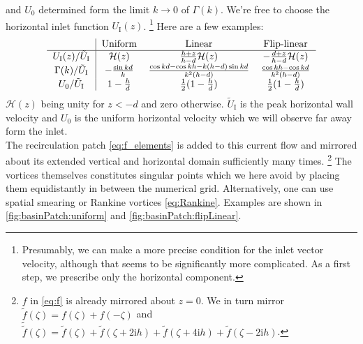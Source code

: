 \documentclass[a4paper,12pt]{article}
\newcommand{\mr}{\mathrm}
\newcommand{\mc}{\mathcal}
\newcommand{\ii}{\mr{i}}
\renewcommand{\_}[1]{_\mr{#1}}
\begin{document}
and $U_0$ determined form the limit $k\to0$ of $\Gamma(k)$.
We're free to choose the horizontal inlet function $U\_I(z)$.%
\footnote{Presumably, we can make a more precise condition for the inlet vector velocity, although that seems to be significantly more complicated. As a first step, we prescribe only the horizontal component.}
 Here are a few examples:
\begin{equation}
\begin{tabular}{c|ccc}
& Uniform & Linear & Flip-linear \\\hline
$U\_I(z)/\tilde U\_I$ & 
$\mc H(z) $&
$\frac{h+z}{h-d}\mc H(z)$&
$-\frac{d+z}{h-d}\mc H(z)$\\
$\Gamma(k)/\tilde U\_I$&
$-\frac{\sin kd}k$&
$\frac{\cos kd-\cos kh -k(h-d)\sin kd}{k^2(h-d)}$ &
$\frac{\cos kh-\cos kd }{k^2(h-d)}$\\
$U_0/\tilde U\_I$ &
$1-\frac hd$ &
$\frac12(1-\frac hd)$ &
$\frac12(1-\frac hd)$
\end{tabular}
\label{eq:Gammas}
\end{equation}
$\mc H(z)$ being unity for $z<-d$ and zero otherwise. $\tilde U\_I$ is the peak horizontal wall velocity and $U_0$ is the uniform horizontal velocity which we will observe far away form the inlet. 
\\

The recirculation patch \eqref{eq:f_elements} is added to this current flow and mirrored about its extended vertical and horizontal domain sufficiently many times.%
\footnote{$f$ in \eqref{eq:f} is already mirrored about $z=0$. We in turn mirror $\tilde f(\zeta)=f(\zeta)+f(-\zeta)$ and $\tilde{\tilde f}(\zeta)= \tilde f(\zeta) + \tilde f(\zeta+2\ii h)+ \tilde f(\zeta+4\ii h)+ \tilde f(\zeta-2\ii h)$.}
The vortices themselves constitutes singular points which we here avoid by placing them equidistantly in between the numerical grid. Alternatively, one can use spatial smearing or Rankine vortices \eqref{eq:Rankine}. 
Examples are shown in \autoref{fig:basinPatch:uniform} and \ref{fig:basinPatch:flipLinear}.
 
\end{document}
